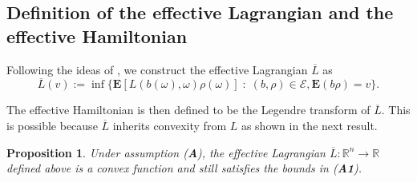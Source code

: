 \documentclass[11pt,reqno]{amsart}
\newtheorem{prop}[thm]{Proposition}
\theoremstyle{definition}
\theoremstyle{remark}
\numberwithin{equation}{section}
\newcommand{\R}{{\mathbb{R}}}
\begin{document}
\medskip

\subsection{Definition of the effective Lagrangian and the effective Hamiltonian}


Following the ideas of \cite{KV-HJB}, we construct the effective Lagrangian $\overline{L}$ as
\begin{equation}
    \overline{L}(v):= \inf \{\mathbf{E}[L(b(\omega),\omega)\rho(\omega)] \;:\; {(b,\rho)\in \mathscr{E}, \mathbf{E}(b\rho)=v}\}.
\end{equation}

The effective Hamiltonian is then defined to be the Legendre transform of $\overline{L}$. This is possible because $\overline{L}$ inherits convexity from $L$ as shown in the next result.

\begin{prop}
\label{prop:propolL}
Under assumption {\upshape({\bf A})}, the effective Lagrangian $\overline L: \R^n\to \R$ defined above is a convex function and still satisfies the bounds in  {\upshape({\bf A1})}.
\end{prop}
\end{document}
